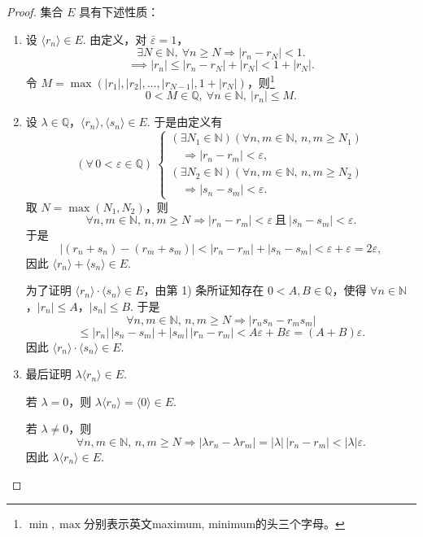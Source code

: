 \begin{proof}

集合 \(E\) 具有下述性质：

\begin{enumerate}[label=\arabic*)]
	\item 设 \(\langle r_n \rangle \in E\). 由定义，对 \(\bar{\varepsilon}=1\)，
	\[
	\exists N\in\mathbb{N},\ \forall n\ge N \Longrightarrow |r_n-r_N|<1.
	\]
	\[
	\implies |r_n| \leqslant |r_n - r_N| + |r_N| < 1 + |r_N|.
	\]
	令 \(M=\max(|r_1|,|r_2|,\dots,|r_{N-1}|,1+|r_N|)\)，则\footnote[1]{$\min,\max$分别表示英文maximum, minimum的头三个字母。}
	\[
	0<M\in\mathbb{Q},\ \forall n\in\mathbb{N},\ |r_n|\leq M.
	\]
	
	\item 设 \(\lambda \in \mathbb{Q}\)，\(\langle r_n \rangle,\langle s_n \rangle \in E\). 于是由定义有
	\[
	(\forall\,0<\varepsilon\in\mathbb{Q})\ 
	\begin{cases}
		(\exists N_1\in\mathbb{N})(\forall n,m\in\mathbb{N},\,n,m\geqslant N_1)\\
		\quad\Longrightarrow |r_n-r_m|<\varepsilon,\\[4pt]
		(\exists N_2\in\mathbb{N})(\forall n,m\in\mathbb{N},\,n,m\geqslant N_2)\\
		\quad\Longrightarrow |s_n-s_m|<\varepsilon.
	\end{cases}
	\]
	取 \(N=\max(N_1,N_2)\)，则
	\[
	\forall n,m\in\mathbb{N},\,n,m\geq N \Longrightarrow |r_n-r_m|<\varepsilon\ \text{且}\ |s_n-s_m|<\varepsilon.
	\]
	于是
	\[
	|(r_n+s_n)-(r_m+s_m)| < |r_n-r_m|+|s_n-s_m| < \varepsilon+\varepsilon = 2\varepsilon,
	\]
	因此 \(\langle r_n \rangle + \langle s_n \rangle \in E\).
	
	为了证明 \(\langle r_n \rangle \cdot \langle s_n \rangle \in E\)，由第 1) 条所证知存在 \(0<A,B\in\mathbb{Q}\)，使得 \(\forall n\in\mathbb{N}\)，\(|r_n|\leq A\)，\(|s_n|\leq B\). 于是
	\[
	\forall n,m\in\mathbb{N},\,n,m\geq N \Longrightarrow |r_n s_n - r_m s_m|
	\]
	\[
	\leq |r_n|\,|s_n-s_m| + |s_m|\,|r_n-r_m|
	< A\varepsilon + B\varepsilon = (A+B)\varepsilon.
	\]
	因此 \(\langle r_n \rangle \cdot \langle s_n \rangle \in E\).
	
	\item 最后证明 \(\lambda \langle r_n \rangle \in E\).
	
	若 \(\lambda=0\)，则 \(\lambda\langle r_n\rangle = \langle 0\rangle \in E\).
	
	若 \(\lambda\neq 0\)，则
	\[
	\forall n,m\in\mathbb{N},\,n,m\geq N \Longrightarrow |\lambda r_n - \lambda r_m| = |\lambda|\,|r_n-r_m| < |\lambda|\varepsilon.
	\]
	因此 \(\lambda \langle r_n \rangle \in E\).
\end{enumerate}

\end{proof}

